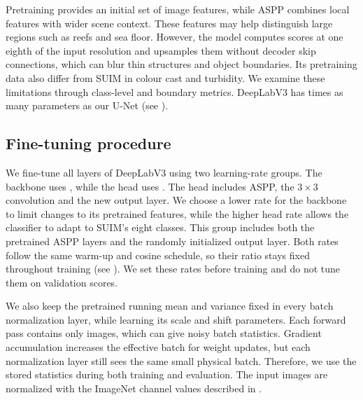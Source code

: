 Pretraining provides an initial set of image features, while ASPP combines
local features with wider scene context. These features may help distinguish
large regions such as reefs and sea floor. However, the model computes scores
at one eighth of the input resolution and upsamples them without decoder skip
connections, which can blur thin structures and object boundaries. Its
pretraining data also differ from SUIM in colour cast and turbidity. We examine
these limitations through class-level and boundary metrics. DeepLabV3 has
\parameterRatio{} times as many parameters as our U-Net
(see ).



\subsection{Fine-tuning procedure}
\label{sec:finetune}
We fine-tune all layers of DeepLabV3 using two learning-rate groups. The
backbone uses \deeplabBackboneRate{}, while the head uses
\deeplabHeadRate{}. The head includes ASPP, the $3\times3$ convolution and the
new output layer. We choose a lower rate for the backbone to limit changes to
its pretrained features, while the higher head rate allows the classifier to
adapt to SUIM's eight classes. This group includes both the pretrained ASPP
layers and the randomly initialized output layer. Both rates follow the same
warm-up and cosine schedule, so their ratio stays fixed throughout training
(see ). We set these rates before training and do not tune
them on validation scores.

We also keep the pretrained running mean and variance fixed in every batch
normalization layer, while learning its scale and shift parameters. Each
forward pass contains only \deeplabBatch{} images, which can give noisy batch
statistics. Gradient accumulation increases the effective batch for weight
updates, but each normalization layer still sees the same small physical batch.
Therefore, we use the stored statistics during both training and evaluation.
The input images are normalized with the ImageNet channel values described in
.

